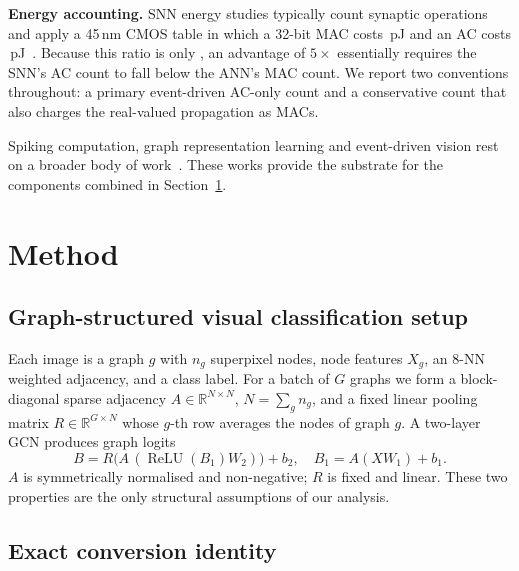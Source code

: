 \textbf{Energy accounting.} SNN energy studies typically count synaptic operations and apply a 45\,nm CMOS table in which a 32-bit MAC costs \MACPJ\,pJ and an AC costs \ACPJ\,pJ~\cite{horowitz2014,eshraghian2023}. Because this ratio is only \MACACRatio, an advantage of $5\times$ essentially requires the SNN's AC count to fall below the ANN's MAC count. We report two conventions throughout: a primary event-driven AC-only count and a conservative count that also charges the real-valued propagation as MACs.

Spiking computation, graph representation learning and event-driven vision rest on a broader body of work~\cite{maass1997,krizhevsky2009,lecun1998,orchard2015,li2017cifardvs,kugele2020,liu2022spikeconverter,zhou2025edge,ji2026gtdl,xia2026neuro,dualphase2024,bojkovic2024ot,yang2025csqcfs,jiang2025fission,sgnnbench2025,hwang2025onespike}. These works provide the substrate for the components combined in Section~\ref{sec:method}.

\section{Method}
\label{sec:method}

\subsection{Graph-structured visual classification setup}
\label{ssec:setup}

Each image is a graph $g$ with $n_g$ superpixel nodes, node features $X_g$, an 8-NN weighted adjacency, and a class label. For a batch of $G$ graphs we form a block-diagonal sparse adjacency $A\in\mathbb{R}^{N\times N}$, $N=\sum_g n_g$, and a fixed linear pooling matrix $R\in\mathbb{R}^{G\times N}$ whose $g$-th row averages the nodes of graph $g$. A two-layer GCN produces graph logits
\begin{equation}
B = R\big(A\,(\operatorname{ReLU}(B_1) W_2)\big) + b_2,\quad
B_1 = A (X W_1) + b_1 .
\label{eq:ann}
\end{equation}
$A$ is symmetrically normalised and non-negative; $R$ is fixed and linear. These two properties are the only structural assumptions of our analysis.

\subsection{Exact conversion identity}
\label{ssec:identity}

